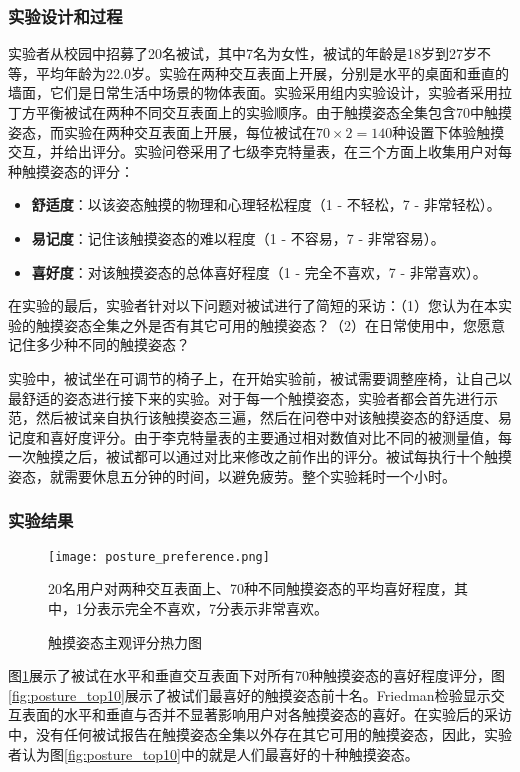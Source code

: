 \subsubsection{实验设计和过程}

实验者从校园中招募了20名被试，其中7名为女性，被试的年龄是18岁到27岁不等，平均年龄为22.0岁。实验在两种交互表面上开展，分别是水平的桌面和垂直的墙面，它们是日常生活中场景的物体表面。实验采用组内实验设计，实验者采用拉丁方平衡被试在两种不同交互表面上的实验顺序。由于触摸姿态全集包含70中触摸姿态，而实验在两种交互表面上开展，每位被试在$70\times2=140$种设置下体验触摸交互，并给出评分。实验问卷采用了七级李克特量表，在三个方面上收集用户对每种触摸姿态的评分：

\begin{itemize}
\item \textbf{舒适度}：以该姿态触摸的物理和心理轻松程度（1 - 不轻松，7 - 非常轻松）。
\item \textbf{易记度}：记住该触摸姿态的难以程度（1 - 不容易，7 - 非常容易）。
\item \textbf{喜好度}：对该触摸姿态的总体喜好程度（1 - 完全不喜欢，7 - 非常喜欢）。
\end{itemize}

在实验的最后，实验者针对以下问题对被试进行了简短的采访：（1）您认为在本实验的触摸姿态全集之外是否有其它可用的触摸姿态？（2）在日常使用中，您愿意记住多少种不同的触摸姿态？

实验中，被试坐在可调节的椅子上，在开始实验前，被试需要调整座椅，让自己以最舒适的姿态进行接下来的实验。对于每一个触摸姿态，实验者都会首先进行示范，然后被试亲自执行该触摸姿态三遍，然后在问卷中对该触摸姿态的舒适度、易记度和喜好度评分。由于李克特量表的主要通过相对数值对比不同的被测量值，每一次触摸之后，被试都可以通过对比来修改之前作出的评分。被试每执行十个触摸姿态，就需要休息五分钟的时间，以避免疲劳。整个实验耗时一个小时。

\subsubsection{实验结果}

\begin{figure}
	\centering
	\texttt{[image: posture\_preference.png]}
	\caption*{20名用户对两种交互表面上、70种不同触摸姿态的平均喜好程度，其中，1分表示完全不喜欢，7分表示非常喜欢。}
	\caption{触摸姿态主观评分热力图}
	\label{fig:posture_preference}
\end{figure}

图\ref{fig:posture_preference}展示了被试在水平和垂直交互表面下对所有70种触摸姿态的喜好程度评分，图\ref{fig:posture_top10}展示了被试们最喜好的触摸姿态前十名。Friedman检验显示交互表面的水平和垂直与否并不显著影响用户对各触摸姿态的喜好。在实验后的采访中，没有任何被试报告在触摸姿态全集以外存在其它可用的触摸姿态，因此，实验者认为图\ref{fig:posture_top10}中的就是人们最喜好的十种触摸姿态。

